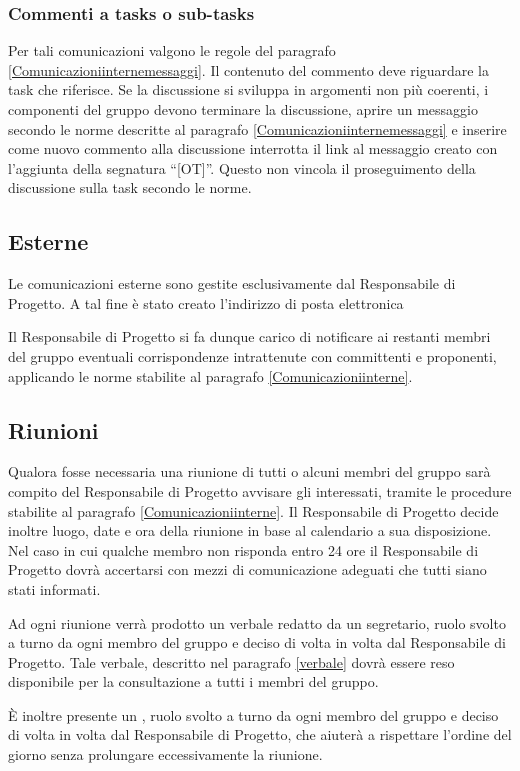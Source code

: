 \subsubsection{Commenti a tasks o sub-tasks}

Per tali comunicazioni valgono le regole del paragrafo \ref{Comunicazioniinternemessaggi}. Il contenuto del commento deve riguardare la task che riferisce. Se la discussione si sviluppa in argomenti non più coerenti, i componenti del gruppo \GroupName{} devono terminare la discussione, aprire un messaggio secondo le norme descritte al paragrafo \ref{Comunicazioniinternemessaggi} e inserire come nuovo commento alla discussione interrotta il link al messaggio creato con l'aggiunta della segnatura ``[OT]''. Questo non vincola il proseguimento della discussione sulla task secondo le norme.

\subsection{Esterne}
\label{email}

Le comunicazioni esterne sono gestite esclusivamente dal Responsabile di Progetto. A tal fine è stato creato l'indirizzo di posta elettronica
\begin{center} \GroupEmail{} \end{center}

Il Responsabile di Progetto si fa dunque carico di notificare ai restanti membri del gruppo eventuali corrispondenze
intrattenute con committenti e proponenti, applicando le norme stabilite al paragrafo \ref{Comunicazioniinterne}.

\subsection{Riunioni}

Qualora fosse necessaria una riunione di tutti o alcuni membri del gruppo sarà compito del Responsabile di Progetto avvisare gli interessati, tramite le procedure stabilite al paragrafo \ref{Comunicazioniinterne}.
Il Responsabile di Progetto decide inoltre luogo, date e ora della riunione in base al calendario a sua disposizione. Nel caso in cui qualche membro non risponda entro 24 ore il Responsabile di Progetto dovrà accertarsi con mezzi di comunicazione adeguati che tutti siano stati informati.

Ad ogni riunione verrà prodotto un verbale redatto da un segretario, ruolo svolto a turno da ogni membro del gruppo e deciso di volta in volta dal Responsabile di Progetto. Tale verbale, descritto nel paragrafo \ref{verbale} dovrà essere reso disponibile per la consultazione a tutti i membri del gruppo.

È inoltre presente un , ruolo svolto a turno da ogni membro del gruppo e deciso di volta in volta dal Responsabile di Progetto, che aiuterà a rispettare l'ordine del giorno senza prolungare eccessivamente la riunione.
